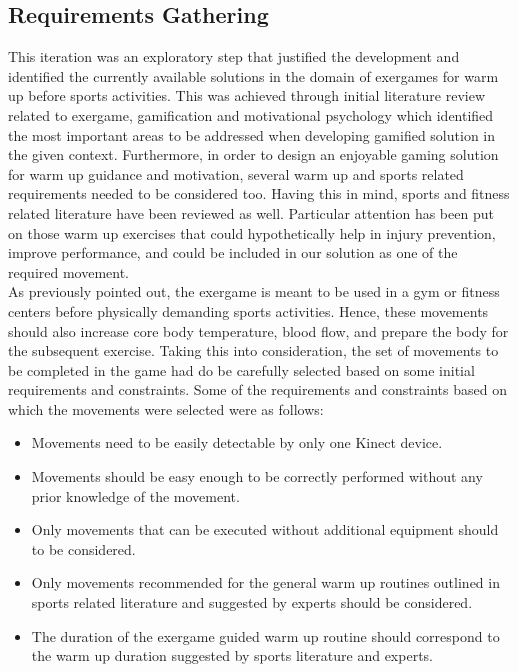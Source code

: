 \subsection{Requirements Gathering}
This iteration was an exploratory step that justified the development and identified the currently available solutions in the domain of exergames for warm up before sports activities. This was achieved through initial literature review related to exergame, gamification and motivational psychology which identified the most important areas to be addressed when developing gamified solution in the given context. Furthermore, in order to design an enjoyable gaming solution for warm up guidance and motivation, several warm up and sports related requirements needed to be considered too. Having this in mind, sports and fitness related literature have been reviewed as well. Particular attention has been put on those warm up exercises that could hypothetically help in injury prevention, improve performance, and could be included in our solution as one of the required movement. \\As previously pointed out, the exergame is meant to be used in a gym or fitness centers before physically demanding sports activities. Hence, these movements should also increase core body temperature, blood flow, and prepare the body for the subsequent exercise. Taking this into consideration, the set of movements to be completed in the game had do be carefully selected based on some initial requirements and constraints. Some of the requirements and constraints based on which the movements were selected were as follows:
\begin{itemize}
\item Movements need to be easily detectable by only one Kinect device.
\item Movements should be easy enough to be correctly performed without any prior knowledge of the movement.
\item Only movements that can be executed without additional equipment should to be considered.   
\item Only movements recommended for the general warm up routines outlined in sports related literature and suggested by experts should be considered.
\item The duration of the exergame guided warm up routine should correspond to the warm up duration suggested by sports literature and experts.
\end{itemize}
